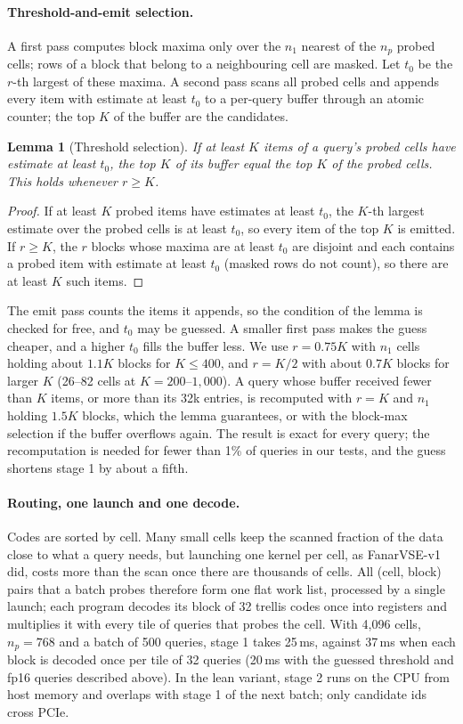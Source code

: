\documentclass[fleqn,10pt]{wlscirep}
\newtheorem{lemma}{Lemma}
\begin{document}
\paragraph{Threshold-and-emit selection.} A first pass computes block maxima only over the $n_1$ nearest of the $n_p$ probed cells; rows of a block that belong to a neighbouring cell are masked. Let $t_0$ be the $r$-th largest of these maxima. A second pass scans all probed cells and appends every item with estimate at least $t_0$ to a per-query buffer through an atomic counter; the top $K$ of the buffer are the candidates.
\begin{lemma}[Threshold selection]\label{lem:thr}
If at least $K$ items of a query's probed cells have estimate at least $t_0$, the top $K$ of its buffer equal the top $K$ of the probed cells. This holds whenever $r\ge K$.
\end{lemma}
\begin{proof}
If at least $K$ probed items have estimates at least $t_0$, the $K$-th largest estimate over the probed cells is at least $t_0$, so every item of the top $K$ is emitted. If $r\ge K$, the $r$ blocks whose maxima are at least $t_0$ are disjoint and each contains a probed item with estimate at least $t_0$ (masked rows do not count), so there are at least $K$ such items.
\end{proof}
The emit pass counts the items it appends, so the condition of the lemma is checked for free, and $t_0$ may be guessed. A smaller first pass makes the guess cheaper, and a higher $t_0$ fills the buffer less. We use $r=0.75K$ with $n_1$ cells holding about $1.1K$ blocks for $K\le400$, and $r=K/2$ with about $0.7K$ blocks for larger $K$ (26--82 cells at $K=200$--$1{,}000$). A query whose buffer received fewer than $K$ items, or more than its 32k entries, is recomputed with $r=K$ and $n_1$ holding $1.5K$ blocks, which the lemma guarantees, or with the block-max selection if the buffer overflows again. The result is exact for every query; the recomputation is needed for fewer than 1\% of queries in our tests, and the guess shortens stage 1 by about a fifth.

\paragraph{Routing, one launch and one decode.} Codes are sorted by cell. Many small cells keep the scanned fraction of the data close to what a query needs, but launching one kernel per cell, as FanarVSE-v1 did, costs more than the scan once there are thousands of cells. All (cell, block) pairs that a batch probes therefore form one flat work list, processed by a single launch; each program decodes its block of 32 trellis codes once into registers and multiplies it with every tile of queries that probes the cell. With 4{,}096 cells, $n_p=768$ and a batch of 500 queries, stage 1 takes 25\,ms, against 37\,ms when each block is decoded once per tile of 32 queries (20\,ms with the guessed threshold and fp16 queries described above). In the lean variant, stage 2 runs on the CPU from host memory and overlaps with stage 1 of the next batch; only candidate ids cross PCIe.
\end{document}
